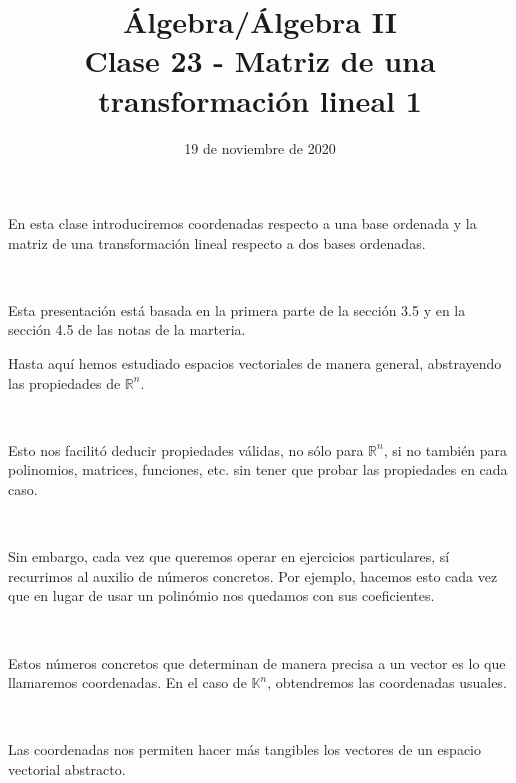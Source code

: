 \documentclass[handout]{beamer} %
\title[Clase 23 -  Matriz de una transformación lineal 1]{Álgebra/Álgebra II \\ Clase 23 - Matriz de una transformación lineal 1}
\author[]{}
\institute[]{\normalsize FAMAF / UNC
	\\[\baselineskip] ${}^{}$
	\\[\baselineskip]
}
\date[19/11/2020]{19 de noviembre de 2020}
\newcommand{\R}{\mathbb R}
\newcommand{\K}{\mathbb K}
\begin{document}
\begin{frame}
\maketitle
\end{frame}




\begin{frame}

En esta clase introduciremos coordenadas respecto a una base ordenada y la matriz de una transformación lineal respecto a dos bases ordenadas.\pause

\

Esta presentación está basada  en la primera parte de la sección 3.5 y en la sección 4.5 de las notas de la marteria.\pause
\

\end{frame}


	\begin{frame}
	
	Hasta aquí hemos estudiado espacios vectoriales de manera general, abstrayendo las propiedades de $\R^n$.\pause
	
	\
	
	Esto nos facilitó deducir propiedades válidas, no sólo para $\R^n$, si no también para polinomios, matrices, funciones, etc. sin tener que probar las propiedades en cada caso.\pause
	
	\
	
	Sin embargo, cada vez que queremos operar en ejercicios particulares, sí recurrimos al auxilio de números concretos. Por ejemplo, hacemos esto cada vez que en lugar de usar un polinómio nos quedamos con sus coeficientes.\pause
	
	\
	
	Estos números concretos que determinan de manera precisa a un vector es lo que llamaremos coordenadas. En el caso de $\K^n$, obtendremos las coordenadas usuales.\pause
	
	\
	
	Las coordenadas nos permiten hacer más tangibles los vectores de un espacio vectorial abstracto.
	\end{frame}
	
\end{document}
